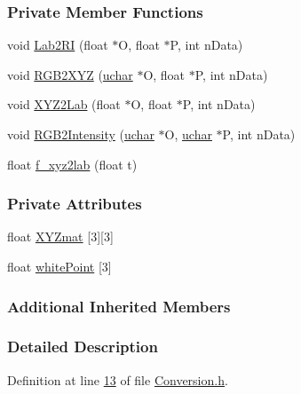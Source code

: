 \subsubsection*{Private Member Functions}
\begin{DoxyCompactItemize}
\item 
void \hyperlink{class_vision_1_1_conversion_adf3ad076d44a9986332f5078c5fa2cc7}{Lab2\+R\+I} (float $\ast$O, float $\ast$P, int n\+Data)
\item 
void \hyperlink{class_vision_1_1_conversion_afe7b24da82f77ff1116f8bc3d0a62fcc}{R\+G\+B2\+X\+Y\+Z} (\hyperlink{_soil_math_types_8h_a65f85814a8290f9797005d3b28e7e5fc}{uchar} $\ast$O, float $\ast$P, int n\+Data)
\item 
void \hyperlink{class_vision_1_1_conversion_a9ecc41c4226eafc55d0ee0cc550e593b}{X\+Y\+Z2\+Lab} (float $\ast$O, float $\ast$P, int n\+Data)
\item 
void \hyperlink{class_vision_1_1_conversion_a93626e56872b99ed79fd3540c6adf776}{R\+G\+B2\+Intensity} (\hyperlink{_soil_math_types_8h_a65f85814a8290f9797005d3b28e7e5fc}{uchar} $\ast$O, \hyperlink{_soil_math_types_8h_a65f85814a8290f9797005d3b28e7e5fc}{uchar} $\ast$P, int n\+Data)
\item 
float \hyperlink{class_vision_1_1_conversion_aea73f90915cd0459dcaf70fb3e109a82}{f\+\_\+xyz2lab} (float t)
\end{DoxyCompactItemize}
\subsubsection*{Private Attributes}
\begin{DoxyCompactItemize}
\item 
float \hyperlink{class_vision_1_1_conversion_ad0c6e6c63380927c63da7f967b5e61d1}{X\+Y\+Zmat} \mbox{[}3\mbox{]}\mbox{[}3\mbox{]}
\item 
float \hyperlink{class_vision_1_1_conversion_adbaed406827f7ffb583d003815a9f3f8}{white\+Point} \mbox{[}3\mbox{]}
\end{DoxyCompactItemize}
\subsubsection*{Additional Inherited Members}


\subsubsection{Detailed Description}


Definition at line \hyperlink{_conversion_8h_source_l00013}{13} of file \hyperlink{_conversion_8h_source}{Conversion.\+h}.



